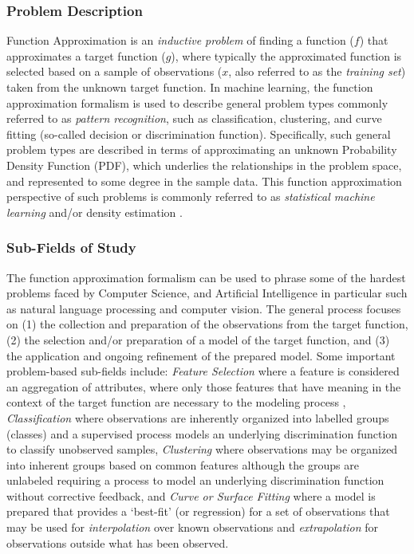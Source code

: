 \documentclass[a4paper, 11pt]{article}
\begin{document}
\subsubsection{Problem Description}
Function Approximation is an \emph{inductive problem} of finding a function ($f$) that approximates a target function ($g$), where typically the approximated function is selected based on a sample of observations ($x$, also referred to as the \emph{training set}) taken from the unknown target function.
In machine learning, the function approximation formalism is used to describe general problem types commonly referred to as \emph{pattern recognition}, such as classification, clustering, and curve fitting (so-called decision or discrimination function). Specifically, such general problem types are described in terms of approximating an unknown Probability Density Function (PDF), which underlies the relationships in the problem space, and represented to some degree in the sample data. This function approximation perspective of such problems is commonly referred to as \emph{statistical machine learning} and/or density estimation \cite{Fukunaga1990, Bishop1995}.

%
%
\subsubsection{Sub-Fields of Study}
The function approximation formalism can be used to phrase some of the hardest problems faced by Computer Science, and Artificial Intelligence in particular such as natural language processing and computer vision. 
The general process focuses on (1) the collection and preparation of the observations from the target function, (2) the selection and/or preparation of a model of the target function, and (3) the application and ongoing refinement of the prepared model. 
Some important problem-based sub-fields include: \emph{Feature Selection} where a feature is considered an aggregation of attributes, where only those features that have meaning in the context of the target function are necessary to the modeling process \cite{Kudo2000, Guyon2003}, \emph{Classification} where observations are inherently organized into labelled groups (classes) and a supervised process models an underlying discrimination function to classify unobserved samples, \emph{Clustering} where observations may be organized into inherent groups based on common features although the groups are unlabeled requiring a process to model an underlying discrimination function without corrective feedback, and \emph{Curve or Surface Fitting} where a model is prepared that provides a `best-fit' (or regression) for a set of observations that may be used for \emph{interpolation} over known observations and \emph{extrapolation} for observations outside what has been observed.
\end{document}

